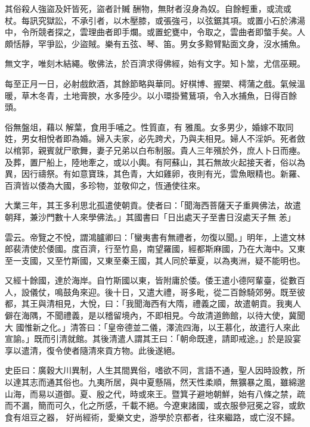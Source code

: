 \begin{pinyinscope}
 其俗殺人強盜及奸皆死，盜者計贓
 酬物，無財者沒身為奴。自餘輕重，或流或杖。每訊究獄訟，不承引者，以木壓膝，或張強弓，以弦鋸其項。或置小石於沸湯中，令所競者探之，雲理曲者即手爛。或置蛇甕中，令取之，雲曲者即螫手矣。人頗恬靜，罕爭訟，少盜賊。樂有五弦、琴、笛。男女多黥臂點面文身，沒水捕魚。



 無文字，唯刻木結繩。敬佛法，於百濟求得佛經，始有文字。知卜筮，尤信巫覡。



 每至正月一日，必射戲飲酒，其餘節略與華同。好棋博、握槊、樗蒲之戲。氣候溫暖，草木冬青，土地膏腴，水多陸少。以小環掛鷺鶿項，令入水捕魚，日得百餘頭。



 俗無盤俎，藉以解葉，食用手哺之。性質直，有
 雅風。女多男少，婚嫁不取同姓，男女相悅者即為婚。婦入夫家，必先跨犬，乃與夫相見。婦人不淫妒。死者斂以棺郭，親賓就尸歌舞，妻子兄弟以白布制服。貴人三年殯於外，庶人卜日而瘞。及葬，置尸船上，陸地牽之，或以小輿。有阿蘇山，其石無故火起接天者，俗以為異，因行禱祭。有如意寶珠，其色青，大如雞卵，夜則有光，雲魚眼精也。新羅、百濟皆以倭為大國，多珍物，並敬仰之，恆通使往來。



 大業三年，其王多利思北孤遣使朝貢。使者曰：「聞海西菩薩天子重興佛法，故遣朝拜，兼沙門數十人來學佛法。」其國書曰「日出處天子至書日沒處天子無
 恙」



 雲云。帝覽之不悅，謂鴻臚卿曰：「蠻夷書有無禮者，勿復以聞。」明年，上遣文林郎裴清使於倭國。度百濟，行至竹島，南望羅國，經都斯麻國，乃在大海中。又東至一支國，又至竹斯國，又東至秦王國，其人同於華夏，以為夷洲，疑不能明也。



 又經十餘國，達於海岸。自竹斯國以東，皆附庸於倭。倭王遣小德阿輩臺，從數百人，設儀仗，鳴鼓角來迎。後十日，又遣大禮，哥多毗，從二百餘騎郊勞。既至彼都，其王與清相見，大悅，曰：「我聞海西有大隋，禮義之國，故遣朝貢。我夷人僻在海隅，不聞禮義，是以稽留境內，不即相見。今故清道飾館，以待大使，冀聞大
 國惟新之化。」清答曰：「皇帝德並二儀，澤流四海，以王慕化，故遣行人來此宣諭。」既而引清就館。其後清遣人謂其王曰：「朝命既達，請即戒途。」於是設宴享以遣清，復令使者隨清來貢方物。此後遂絕。



 史臣曰：廣穀大川異制，人生其間異俗，嗜欲不同，言語不通，聖人因時設教，所以達其志而通其俗也。九夷所居，與中夏懸隔，然天性柔順，無獷暴之風，雖綿邈山海，而易以道御。夏、殷之代，時或來王。暨箕子避地朝鮮，始有八條之禁，疏而不漏，簡而可久，化之所感，千載不絕。今遼東諸國，或衣服參冠冕之容，或飲食有俎豆之器，
 好尚經術，愛樂文史，游學於京都者，往來繼路，或亡沒不歸。




\end{pinyinscope}
